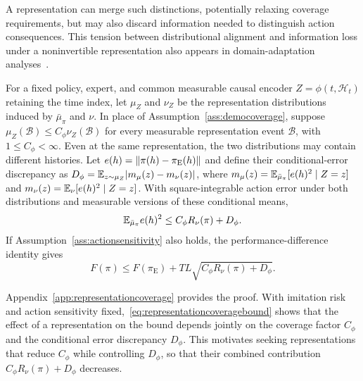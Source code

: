 A representation can merge such distinctions, potentially relaxing coverage requirements,
but may also discard information needed to distinguish action consequences.
This tension between distributional alignment and information loss under a noninvertible representation
also appears in domain-adaptation analyses~\cite{johansson2019support,zhao2019invariant}.

For a fixed policy, expert, and common measurable causal encoder $Z=\phi(t,\mathcal H_t)$ retaining the time index, let $\mu_Z$ and $\nu_Z$ be the representation distributions induced by $\bar\mu_\pi$ and $\nu$.
In place of Assumption~\ref{ass:democoverage}, suppose
$\mu_Z(\mathcal B)\le C_\phi\nu_Z(\mathcal B)$ for every measurable representation event $\mathcal B$, with $1\le C_\phi<\infty$.
Even at the same representation, the two distributions may contain different histories.
Let $e(h)=\lVert\pi(h)-\pi_{\mathrm E}(h)\rVert$ and define their conditional-error discrepancy as $D_\phi=\mathbb E_{z\sim\mu_Z}|m_\mu(z)-m_\nu(z)|$,
where $m_\mu(z)=\mathbb E_{\bar\mu_\pi}[e(h)^2\mid Z=z]$ and $m_\nu(z)=\mathbb E_\nu[e(h)^2\mid Z=z]$.
With square-integrable action error under both distributions and measurable versions of these conditional means,
\begin{equation}
 \mathbb E_{\bar\mu_\pi}e(h)^2
 \le C_\phi R_\nu(\pi)+D_\phi.
 \label{eq:representationrisktransfer-main}
\end{equation}
If Assumption~\ref{ass:actionsensitivity} also holds, the performance-difference identity gives
\begin{equation}
 F(\pi)\le F(\pi_{\mathrm E})
       +TL\sqrt{C_\phi R_\nu(\pi)+D_\phi}.
 \label{eq:representationcoveragebound}
\end{equation}

Appendix~\ref{app:representationcoverage} provides the proof.
With imitation risk and action sensitivity fixed,~\eqref{eq:representationcoveragebound}
shows that the effect of a representation on the bound depends jointly on
the coverage factor $C_\phi$ and the conditional error discrepancy $D_\phi$.
This motivates seeking representations that reduce $C_\phi$ while controlling $D_\phi$,
so that their combined contribution $C_\phi R_\nu(\pi)+D_\phi$ decreases.

